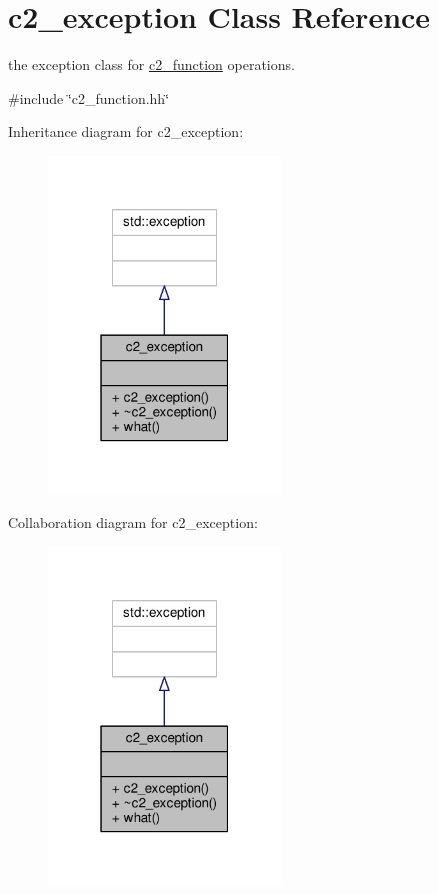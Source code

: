 \hypertarget{classc2__exception}{}\section{c2\+\_\+exception Class Reference}
\label{classc2__exception}


the exception class for \hyperlink{classc2__function}{c2\+\_\+function} operations.  




{\ttfamily \#include \char`\"{}c2\+\_\+function.\+hh\char`\"{}}



Inheritance diagram for c2\+\_\+exception\+:
\nopagebreak
\begin{figure}[H]
\begin{center}
\leavevmode
\includegraphics[width=175pt]{classc2__exception__inherit__graph}
\end{center}
\end{figure}


Collaboration diagram for c2\+\_\+exception\+:
\nopagebreak
\begin{figure}[H]
\begin{center}
\leavevmode
\includegraphics[width=175pt]{classc2__exception__coll__graph}
\end{center}
\end{figure}

